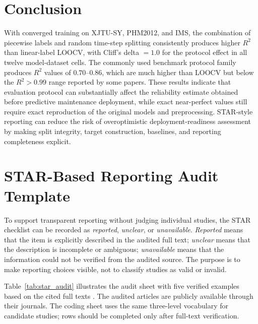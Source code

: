 \documentclass[pdflatex,sn-mathphys-num]{sn-jnl}
\begin{document}
\section{Conclusion}
With converged training on XJTU-SY, PHM2012, and IMS, the combination of piecewise labels and random time-step splitting consistently produces higher $R^2$ than linear-label LOOCV, with Cliff's delta $=1.0$ for the protocol effect in all twelve model-dataset cells. The commonly used benchmark protocol family produces $R^2$ values of $0.70$--$0.86$, which are much higher than LOOCV but below the $R^2>0.99$ range reported by some papers. These results indicate that evaluation protocol can substantially affect the reliability estimate obtained before predictive maintenance deployment, while exact near-perfect values still require exact reproduction of the original models and preprocessing. STAR-style reporting can reduce the risk of overoptimistic deployment-readiness assessment by making split integrity, target construction, baselines, and reporting completeness explicit.

\appendix
\section{STAR-Based Reporting Audit Template}
To support transparent reporting without judging individual studies, the STAR checklist can be recorded as \emph{reported}, \emph{unclear}, or \emph{unavailable}. \emph{Reported} means that the item is explicitly described in the audited full text; \emph{unclear} means that the description is incomplete or ambiguous; \emph{unavailable} means that the information could not be verified from the audited source. The purpose is to make reporting choices visible, not to classify studies as valid or invalid.

Table~\ref{tab:star_audit} illustrates the audit sheet with five verified examples based on the cited full texts \cite{wu2020cascade,yang2024cnnvaembilstm,wen2024envelope,li2022twostage,li2022soasvm}. The audited articles are publicly available through their journals. The coding sheet uses the same three-level vocabulary for candidate studies; rows should be completed only after full-text verification.
\end{document}
